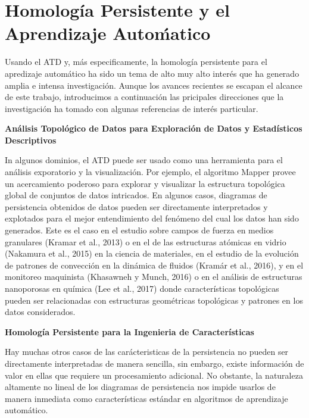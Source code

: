 \section{Homolog\'ia Persistente y el Aprendizaje Auto\'matico}

Usando el ATD y, m\'as especificamente, la homolog\'ia persistente para el
apredizaje autom\'atico ha sido un tema de alto muy alto inter\'es que ha
generado amplia e intensa investigaci\'on.
Aunque los avances recientes se escapan el alcance de este trabajo,
introducimos a continuaci\'on las pricipales direcciones que la investigaci\'on
ha tomado con algunas referencias de inter\'es particular. \medskip\medskip

\textbf{\large An\'alisis Topol\'ogico de Datos para
Exploraci\'on de Datos y Estad\'isticos Descriptivos}

In algunos dominios, el ATD puede ser usado como una herramienta para el an\'alisis exporatorio
y la visualizaci\'on.
Por ejemplo, el algoritmo Mapper provee un acercamiento poderoso para explorar y visualizar
la estructura topol\'ogica global de conjuntos de datos intricados.
En algunos casos, diagramas de persistencia obtenidos de datos pueden ser directamente
interpretados y explotados para el mejor entendimiento del fen\'omeno del cual los
datos han sido generados.
Este es el caso en el estudio sobre campos de fuerza en medios granulares
(Kramar et al., 2013\cite{Kramar2013}) o en el de las estructuras at\'omicas en vidrio
(Nakamura et al., 2015\cite{Nakamura2015}) en la ciencia de materiales,
en el estudio de la evoluci\'on de patrones de convecci\'on en la din\'amica de fluidos
(Kram\'ar et al., 2016\cite{Kramar2016}), y en el monitoreo maquinista
(Khasawneh y Munch, 2016\cite{Khasawneh2016}) o en el an\'alisis de estructuras
nanoporosas en qu\'imica (Lee et al., 2017\cite{Lee2017}) donde caracter\'isticas
topol\'ogicas pueden ser relacionadas con estructuras geom\'etricas topol\'ogicas
y patrones en los datos considerados.\medskip\medskip


\textbf{\large Homolog\'ia Persistente para la Ingenieria de Caracter\'isticas}

Hay muchas otros casos de las car\'acteristicas de la persistencia no pueden ser
directamente interpretadas de manera sencilla, sin embargo, existe informaci\'on de valor
en ellas que requiere un procesamiento adicional.
No obstante, la naturaleza altamente no lineal de los diagramas de persistencia
nos impide usarlos de manera inmediata como caracter\'isticas est\'andar en algoritmos de
aprendizaje autom\'atico.

